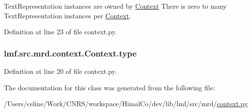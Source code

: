 Text\+Representation instances are owned by \hyperlink{classlmf_1_1src_1_1mrd_1_1context_1_1_context}{Context} There is zero to many Text\+Representation instances per \hyperlink{classlmf_1_1src_1_1mrd_1_1context_1_1_context}{Context}. 



Definition at line 23 of file context.\+py.

\hypertarget{classlmf_1_1src_1_1mrd_1_1context_1_1_context_a785d657d9be0addc379745e7efa4996b}{
\subsubsection[{type}]{\setlength{\rightskip}{0pt plus 5cm}lmf.\+src.\+mrd.\+context.\+Context.\+type}}\label{classlmf_1_1src_1_1mrd_1_1context_1_1_context_a785d657d9be0addc379745e7efa4996b}


Definition at line 20 of file context.\+py.



The documentation for this class was generated from the following file\+:\begin{DoxyCompactItemize}
\item 
/\+Users/celine/\+Work/\+C\+N\+R\+S/workspace/\+Himal\+Co/dev/lib/lmf/src/mrd/\hyperlink{context_8py}{context.\+py}\end{DoxyCompactItemize}
